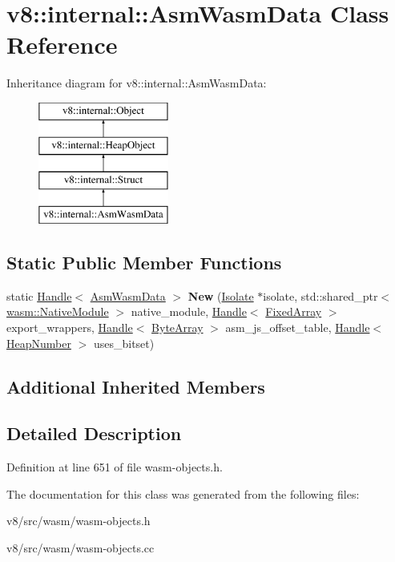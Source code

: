 \hypertarget{classv8_1_1internal_1_1AsmWasmData}{}\section{v8\+:\+:internal\+:\+:Asm\+Wasm\+Data Class Reference}
\label{classv8_1_1internal_1_1AsmWasmData}
Inheritance diagram for v8\+:\+:internal\+:\+:Asm\+Wasm\+Data\+:\begin{figure}[H]
\begin{center}
\leavevmode
\includegraphics[height=4.000000cm]{classv8_1_1internal_1_1AsmWasmData}
\end{center}
\end{figure}
\subsection*{Static Public Member Functions}
\begin{DoxyCompactItemize}
\item 
\mbox{\label{classv8_1_1internal_1_1AsmWasmData_ad069cb1a4c9a4f314c1dac908da5b92f}} 
static \mbox{\hyperlink{classv8_1_1internal_1_1Handle}{Handle}}$<$ \mbox{\hyperlink{classv8_1_1internal_1_1AsmWasmData}{Asm\+Wasm\+Data}} $>$ {\bfseries New} (\mbox{\hyperlink{classv8_1_1internal_1_1Isolate}{Isolate}} $\ast$isolate, std\+::shared\+\_\+ptr$<$ \mbox{\hyperlink{classv8_1_1internal_1_1wasm_1_1NativeModule}{wasm\+::\+Native\+Module}} $>$ native\+\_\+module, \mbox{\hyperlink{classv8_1_1internal_1_1Handle}{Handle}}$<$ \mbox{\hyperlink{classv8_1_1internal_1_1FixedArray}{Fixed\+Array}} $>$ export\+\_\+wrappers, \mbox{\hyperlink{classv8_1_1internal_1_1Handle}{Handle}}$<$ \mbox{\hyperlink{classv8_1_1internal_1_1ByteArray}{Byte\+Array}} $>$ asm\+\_\+js\+\_\+offset\+\_\+table, \mbox{\hyperlink{classv8_1_1internal_1_1Handle}{Handle}}$<$ \mbox{\hyperlink{classv8_1_1internal_1_1HeapNumber}{Heap\+Number}} $>$ uses\+\_\+bitset)
\end{DoxyCompactItemize}
\subsection*{Additional Inherited Members}


\subsection{Detailed Description}


Definition at line 651 of file wasm-\/objects.\+h.



The documentation for this class was generated from the following files\+:\begin{DoxyCompactItemize}
\item 
v8/src/wasm/wasm-\/objects.\+h\item 
v8/src/wasm/wasm-\/objects.\+cc\end{DoxyCompactItemize}
